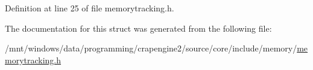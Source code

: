 Definition at line 25 of file memorytracking.\+h.



The documentation for this struct was generated from the following file\+:\begin{DoxyCompactItemize}
\item 
/mnt/windows/data/programming/crapengine2/source/core/include/memory/\hyperlink{memorytracking_8h}{memorytracking.\+h}\end{DoxyCompactItemize}
